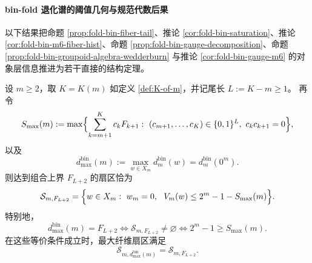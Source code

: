 \paragraph{bin-fold 退化谱的阈值几何与规范代数后果}
以下结果把命题 \ref{prop:fold-bin-fiber-tail}、推论 \ref{cor:fold-bin-saturation}、推论 \ref{cor:fold-bin-m6-fiber-hist}、命题 \ref{prop:fold-bin-gauge-decomposition}、命题 \ref{prop:fold-bin-groupoid-algebra-wedderburn} 与推论 \ref{cor:fold-bin-gauge-m6} 的对象层信息推进为若干直接的结构定理。

\begin{theorem}\label{thm:foldbin-saturation-sector-threshold}
设 \(m\ge 2\)，取 \(K=K(m)\) 如定义 \ref{def:K-of-m}，并记尾长 \(L:=K-m\ge 1\)。
再令
\[
S_{\max}(m):=\max\Bigl\{\sum_{k=m+1}^{K} c_kF_{k+1}:\ (c_{m+1},\dots,c_K)\in\{0,1\}^{L},\ c_kc_{k+1}=0\Bigr\},
\]
以及
\[
d^{\mathrm{bin}}_{\max}(m):=\max_{w\in X_m} d_m^{\mathrm{bin}}(w)=d_m^{\mathrm{bin}}(0^m).
\]
则达到组合上界 \(F_{L+2}\) 的扇区恰为
\begin{equation}\label{eq:foldbin-saturation-sector-threshold}
\mathcal S_{m,F_{L+2}}
=
\Bigl\{
w\in X_m:\ w_m=0,\ \ V_m(w)\le 2^m-1-S_{\max}(m)
\Bigr\}.
\end{equation}
特别地，
\begin{equation}\label{eq:foldbin-saturation-sector-nonempty}
d^{\mathrm{bin}}_{\max}(m)=F_{L+2}
\iff
\mathcal S_{m,F_{L+2}}\neq\varnothing
\iff
2^m-1\ge S_{\max}(m).
\end{equation}
在这些等价条件成立时，最大纤维扇区满足
\[
\mathcal S_{m,d^{\mathrm{bin}}_{\max}(m)}=\mathcal S_{m,F_{L+2}}.
\]
\end{theorem}
